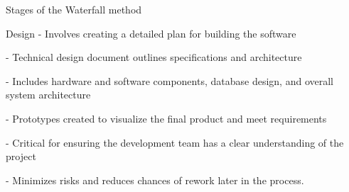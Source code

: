 \begin{frame}{Stages of the Waterfall method}
    \begin{block}{Design}
    - Involves creating a detailed plan for building the software
    
    - Technical design document outlines specifications and architecture
    
    - Includes hardware and software components, database design, and overall system architecture
    
    - Prototypes created to visualize the final product and meet requirements
    
    - Critical for ensuring the development team has a clear understanding of the project
    
    - Minimizes risks and reduces chances of rework later in the process.
    \end{block}    
\end{frame}